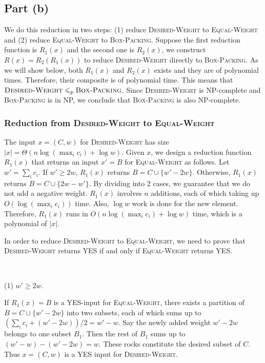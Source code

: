 \documentclass{article}
\begin{document}
\subsection{Part (b)}
We do this reduction in two steps: (1) reduce \textsc{Desired-Weight} to \textsc{Equal-Weight} and (2) reduce \textsc{Equal-Weight} to \textsc{Box-Packing}. Suppose the first reduction function is $R_1(x)$ and the second one is $R_2(x)$, we construct $R(x)=R_2(R_1(x))$ to reduce \textsc{Desired-Weight} directly to \textsc{Box-Packing}. As we will show below, both $R_1(x)$ and $R_2(x)$ exists and they are of polynomial times. Therefore, their composite is of polynomial time. This means that $\textsc{Desired-Weight}\leqslant_p\textsc{Box-Packing}$. Since \textsc{Desired-Weight} is NP-complete and \textsc{Box-Packing} is in NP, we conclude that \textsc{Box-Packing} is also NP-complete.

\subsubsection{Reduction from \textsc{Desired-Weight} to \textsc{Equal-Weight}}
The input $x=(C,w)$ for \textsc{Desired-Weight} has size $|x|=\Theta(n\log(\max_ic_i)+\log w)$. Given $x$, we design a reduction function $R_1(x)$ that returns an input $x'=B$ for \textsc{Equal-Weight} as follows. Let $w'=\sum_ic_i$. If $w'\geqslant2w$, $R_1(x)$ returns $B=C\cup\{w'-2w\}$. Otherwise, $R_1(x)$ returns $B=C\cup\{2w-w'\}$. By dividing into 2 cases, we guarantee that we do not add a negative weight. $R_1(x)$ involves $n$ additions, each of which taking up $O(\log(\max_ic_i))$ time. Also, $\log w$ work is done for the new element. Therefore, $R_1(x)$ runs in $O(n\log(\max_ic_i)+\log w)$ time, which is a polynomial of $|x|$.

In order to reduce \textsc{Desired-Weight} to \textsc{Equal-Weight}, we need to prove that \textsc{Desired-Weight} returns YES if and only if \textsc{Equal-Weight} returns YES.

~

\noindent(1) $w'\geqslant2w$.

If $R_1(x)=B$ is a YES-input for \textsc{Equal-Weight}, there exists a partition of $B=C\cup\{w'-2w\}$ into two subsets, each of which sums up to $(\sum_ic_i+(w'-2w))/2=w'-w$. Say the newly added weight $w'-2w$ belongs to one subset $B_1$. Then the rest of $B_1$ sums up to $(w'-w)-(w'-2w)=w$. These rocks constitute the desired subset of $C$. Thus $x=(C,w)$ is a YES input for \textsc{Desired-Weight}.
\end{document}
